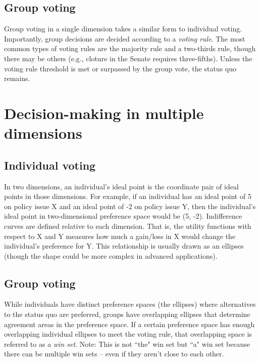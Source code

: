 \documentclass[10pt]{article}
\begin{document}
	\subsection{Group voting}
	Group voting in a single dimension takes a similar form to individual voting. Importantly, group decisions are decided according to a \textit{voting rule}. The most common types of voting rules are the majority rule and a two-thirds rule, though there may be others (e.g., cloture in the Senate requires three-fifths). Unless the voting rule threshold is met or surpassed by the group vote, the status quo remains. 
	
	
	
	\section{Decision-making in multiple dimensions}
	
	\subsection{Individual voting}
	
	In two dimensions, an individual's ideal point is the coordinate pair of ideal points in those dimensions. For example, if an individual has an ideal point of 5 on policy issue X and an ideal point of -2 on policy issue Y, then the individual's ideal point in two-dimensional preference space would be (5, -2). Indifference curves are defined relative to each dimension. That is, the utility functions with respect to X and Y measures how much a gain/loss in X would change the individual's preference for Y. This relationship is usually drawn as an ellipses (though the shape could be more complex in advanced applications). 
	
	\subsection{Group voting}
	
	While individuals have distinct preference spaces (the ellipses) where alternatives to the status quo are preferred, groups have overlapping ellipses that determine agreement areas in the preference space. If a certain preference space has enough overlapping individual ellipses to meet the voting rule, that overlapping space is referred to as a \textit{win set}. Note: This is not ``the" win set but ``a" win set because there can be multiple win sets -- even if they aren't close to each other. 
	
\end{document}
